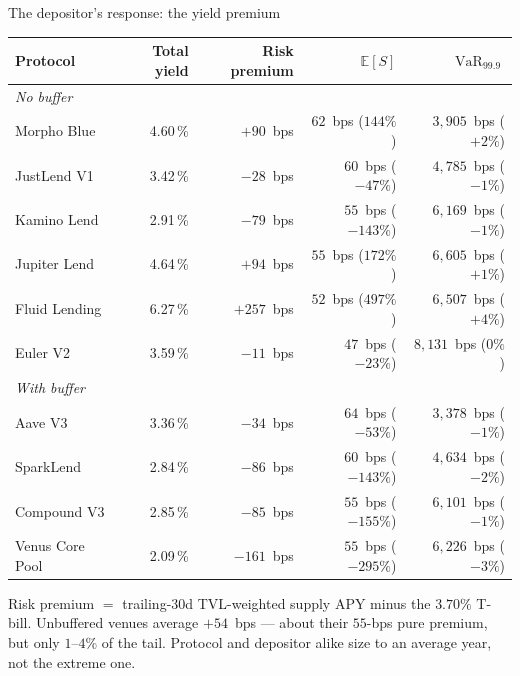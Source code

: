 \documentclass[10pt,xcolor=x11names,aspectratio=169]{beamer}
\newcommand{\VaR}{\operatorname{VaR}}
\newcommand{\E}{\mathbb{E}}
\begin{document}
\begin{frame}{The depositor's response: the yield premium}
  \vskip 1mm
  \begin{center}
    \footnotesize
    \begin{tabular}{l r r r r}
      \toprule
      Protocol & Total yield & Risk premium & $\E[S]$ & $\VaR_{99.9}$ \\
      \midrule
      \multicolumn{5}{l}{\emph{No buffer}} \\
      Morpho Blue   & 4.60\,\% & $+90$~bps  & $62$~bps ($144\%$)  & $3{,}905$~bps ($+2\%$) \\
      JustLend V1   & 3.42\,\% & $-28$~bps  & $60$~bps ($-47\%$)  & $4{,}785$~bps ($-1\%$) \\
      Kamino Lend   & 2.91\,\% & $-79$~bps  & $55$~bps ($-143\%$) & $6{,}169$~bps ($-1\%$) \\
      Jupiter Lend  & 4.64\,\% & $+94$~bps  & $55$~bps ($172\%$)  & $6{,}605$~bps ($+1\%$) \\
      Fluid Lending & 6.27\,\% & $+257$~bps & $52$~bps ($497\%$)  & $6{,}507$~bps ($+4\%$) \\
      Euler V2      & 3.59\,\% & $-11$~bps  & $47$~bps ($-23\%$)  & $8{,}131$~bps ($0\%$) \\
      \midrule
      \multicolumn{5}{l}{\emph{With buffer}} \\
      Aave V3         & 3.36\,\% & $-34$~bps  & $64$~bps ($-53\%$)  & $3{,}378$~bps ($-1\%$) \\
      SparkLend       & 2.84\,\% & $-86$~bps  & $60$~bps ($-143\%$) & $4{,}634$~bps ($-2\%$) \\
      Compound V3     & 2.85\,\% & $-85$~bps  & $55$~bps ($-155\%$) & $6{,}101$~bps ($-1\%$) \\
      Venus Core Pool & 2.09\,\% & $-161$~bps & $55$~bps ($-295\%$) & $6{,}226$~bps ($-3\%$) \\
      \bottomrule
    \end{tabular}
  \end{center}
  \small
  Risk premium $=$ trailing-30d TVL-weighted supply APY minus the $3.70\%$
  T-bill. Unbuffered venues average $+54$~bps --- about their $55$-bps pure
  premium, but only $1$--$4\%$ of the tail. Protocol and depositor alike size
  to an average year, not the extreme one.
\end{frame}
\end{document}
